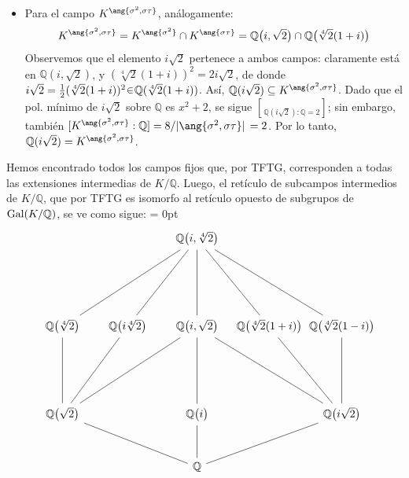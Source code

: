\begin{sol}
\begin{enumerate}[label=\alph*)]
\begin{itemize}
    \item 
    Para el campo $K^{\ang{\sigma^2,\sigma\tau}}$, análogamente:
    \[
    K^{\ang{\sigma^2,\sigma\tau}} = K^{\ang{\sigma^2}} \cap K^{\ang{\sigma\tau}} = \mathbb{Q}\big(i,\sqrt{2}\big) \cap \mathbb{Q}\big(\sqrt[4]{2}(1+i)\big)
    \]
    Observemos que el elemento $i\sqrt{2}$ pertenece a ambos campos: claramente está en $\mathbb{Q}(i,\sqrt{2})$, y $(\sqrt[4]{2}(1+i))^2 = 2i\sqrt{2}$, de donde $i\sqrt{2} = \frac{1}{2}(\sqrt[4]{2}(1+i))^2 \en \mathbb{Q}(\sqrt[4]{2}(1+i))$. Así, $\mathbb{Q}(i\sqrt{2}) \subseteq K^{\ang{\sigma^2,\sigma\tau}}$. Dado que el pol. mínimo de $i\sqrt{2}$ sobre $\mathbb{Q}$ es $x^2+2$, se sigue $\brack{{\mathbb{Q}(i\sqrt{2})}:\mathbb{Q}} =2$; sin embargo, también $\brack{K^{\ang{\sigma^2,\sigma\tau}} :\mathbb{Q}} = 8/\abs*{\ang{\sigma^2,\sigma\tau}} = 2$. Por lo tanto, $\mathbb{Q}(i\sqrt{2}) = K^{\ang{\sigma^2,\sigma\tau}}$.
\end{itemize}
 Hemos encontrado todos los campos fijos que, por TFTG, corresponden a todas las extensiones intermedias de $K/\mathbb{Q}$. Luego, el retículo de subcampos intermedios de $K/\mathbb{Q}$, que por TFTG es isomorfo al retículo opuesto de subgrupos de $\operatorname{Gal}(K/\mathbb{Q})$, se ve como sigue:
 {\mathsurround = 0pt
\[\begin{tikzcd}[column sep=1.8em,row sep = 3em]
	&& {\mathbb{Q}\big(i,\sqrt[4]{2}\big)} \\
	\\
	{\mathbb{Q}\big(\sqrt[4]{2}\big)} & {\mathbb{Q}\big(i\sqrt[4]{2}\big)} & {\mathbb{Q}\big(i,\sqrt{2}\big)} & {\hspace{-1em}\mathbb{Q}\big(\sqrt[4]{2}(1+i)\big)\hspace{-1em}} & {\hspace{-1em}\mathbb{Q}\big(\sqrt[4]{2}(1-i)\big)\hspace{-1em}} \\
	\\
	{\mathbb{Q}\big(\sqrt{2}\big)} && {\mathbb{Q}\big(i\big)} && {\mathbb{Q}\big(i\sqrt{2}\big)} \\
	&& {\mathbb{Q}}
	\arrow[no head, from=3-1, to=1-3]
	\arrow[no head, from=3-2, to=1-3]
	\arrow[no head, from=3-3, to=1-3]
	\arrow[no head, from=3-4, to=1-3]
	\arrow[no head, from=3-5, to=1-3]
	\arrow[no head, from=5-1, to=3-1]
	\arrow[no head, from=5-1, to=3-2]
	\arrow[no head, from=5-1, to=3-3]
	\arrow[no head, from=5-3, to=3-3]
	\arrow[no head, from=5-5, to=3-3]
	\arrow[no head, from=5-5, to=3-4]
	\arrow[no head, from=5-5, to=3-5]
	\arrow[no head, from=6-3, to=5-1]
	\arrow[no head, from=6-3, to=5-3]
	\arrow[no head, from=6-3, to=5-5]
\end{tikzcd}\]
}\qedhere
\end{enumerate}
\end{sol}

